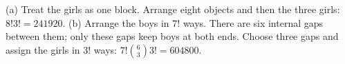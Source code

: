 (a) Treat the girls as one block. Arrange eight objects and then the three girls: $8!3!=\boxed{241920}$. (b) Arrange the boys in $7!$ ways. There are six internal gaps between them; only these gaps keep boys at both ends. Choose three gaps and assign the girls in $3!$ ways: $7!\binom63 3!=\boxed{604800}$.
